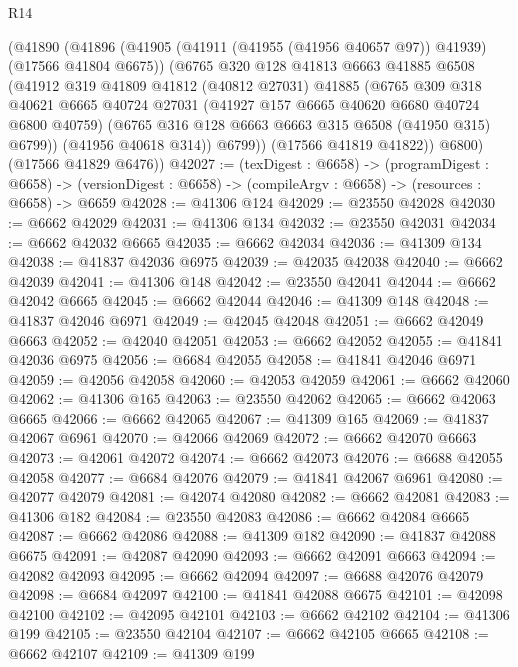 \begin{lexlean}{R14}
\begin{coremodule}
        (@41890
          (@41896
            (@41905 (@41911 (@41955 (@41956 @40657 @97)) @41939) (@17566 @41804 @6675))
            (@6765
              @320
              @128
              @41813
              @6663
              @41885
              @6508
              (@41912
                @319
                @41809
                @41812
                (@40812 @27031)
                @41885
                (@6765
                  @309
                  @318
                  @40621
                  @6665
                  @40724
                  @27031
                  (@41927 @157 @6665 @40620 @6680 @40724 @6800 @40759)
                  (@6765 @316 @128 @6663 @6663 @315 @6508 (@41950 @315) @6799))
                (@41956 @40618 @314))
              @6799))
          (@17566 @41819 @41822))
        @6800)
      (@17566 @41829 @6476))
@42027 := (texDigest : @6658) ->
  (programDigest : @6658) ->
  (versionDigest : @6658) -> (compileArgv : @6658) -> (resources : @6658) -> @6659
@42028 := @41306 @124
@42029 := @23550 @42028
@42030 := @6662 @42029
@42031 := @41306 @134
@42032 := @23550 @42031
@42034 := @6662 @42032 @6665
@42035 := @6662 @42034
@42036 := @41309 @134
@42038 := @41837 @42036 @6975
@42039 := @42035 @42038
@42040 := @6662 @42039
@42041 := @41306 @148
@42042 := @23550 @42041
@42044 := @6662 @42042 @6665
@42045 := @6662 @42044
@42046 := @41309 @148
@42048 := @41837 @42046 @6971
@42049 := @42045 @42048
@42051 := @6662 @42049 @6663
@42052 := @42040 @42051
@42053 := @6662 @42052
@42055 := @41841 @42036 @6975
@42056 := @6684 @42055
@42058 := @41841 @42046 @6971
@42059 := @42056 @42058
@42060 := @42053 @42059
@42061 := @6662 @42060
@42062 := @41306 @165
@42063 := @23550 @42062
@42065 := @6662 @42063 @6665
@42066 := @6662 @42065
@42067 := @41309 @165
@42069 := @41837 @42067 @6961
@42070 := @42066 @42069
@42072 := @6662 @42070 @6663
@42073 := @42061 @42072
@42074 := @6662 @42073
@42076 := @6688 @42055 @42058
@42077 := @6684 @42076
@42079 := @41841 @42067 @6961
@42080 := @42077 @42079
@42081 := @42074 @42080
@42082 := @6662 @42081
@42083 := @41306 @182
@42084 := @23550 @42083
@42086 := @6662 @42084 @6665
@42087 := @6662 @42086
@42088 := @41309 @182
@42090 := @41837 @42088 @6675
@42091 := @42087 @42090
@42093 := @6662 @42091 @6663
@42094 := @42082 @42093
@42095 := @6662 @42094
@42097 := @6688 @42076 @42079
@42098 := @6684 @42097
@42100 := @41841 @42088 @6675
@42101 := @42098 @42100
@42102 := @42095 @42101
@42103 := @6662 @42102
@42104 := @41306 @199
@42105 := @23550 @42104
@42107 := @6662 @42105 @6665
@42108 := @6662 @42107
@42109 := @41309 @199

\end{coremodule}
\end{lexlean}
